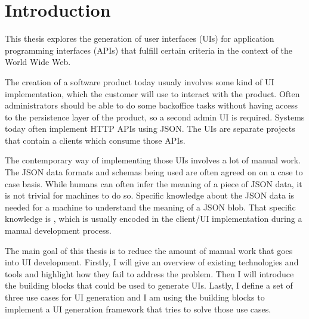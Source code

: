 \section{Introduction}\label{introduction}

This thesis explores the generation of user interfaces (UIs) for application programming interfaces (APIs) that fulfill certain criteria in the context of the World Wide Web.

The creation of a software product today usualy involves some kind of UI implementation, which the customer will use to interact with the product. Often administrators should be able to do some backoffice tasks without having access to the persistence layer of the product, so a second admin UI is required. Systems today often implement HTTP APIs using JSON. The UIs are separate projects that contain a clients which consume those APIs.

The contemporary way of implementing those UIs involves a lot of manual work. The JSON data formats and schemas being used are often agreed on on a case to case basis. While humans can often infer the meaning of a piece of JSON data, it is not trivial for machines to do so. Specific knowledge about the JSON data is needed for a machine to understand the meaning of a JSON blob. That specific knowledge is , which is usually encoded in the client/UI implementation during a manual development process.

The main goal of this thesis is to reduce the amount of manual work that goes into UI development. Firstly, I will give an overview of existing technologies and tools and highlight how they fail to address the problem. Then I will introduce the building blocks that could be used to generate UIs. Lastly, I define a set of three use cases for UI generation and I am using the building blocks to implement a UI generation framework that tries to solve those use cases.
